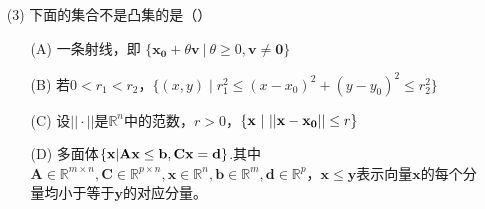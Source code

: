 \documentclass[12pt,a4paper,openany,twoside]{ctexbook}
\begin{document}
\begin{exercise}
\begin{itemize}


		\item [(3)] 下面的集合不是凸集的是（\quad）
		\begin{itemize}
			\item [(A)] 一条射线，即 $\{\mathbf{x_0}+\theta\mathbf{v}\ |\  \theta \geq0 ,\mathbf{v} \not= \mathbf{0}\}$
			\item [(B)] 若$0<r_1 < r_2$，$\{(x, y) \mid r_1^2 \leq (x - x_0)^2 + (y - y_0)^2 \leq r_2^2\}$
			\item [(C)] 设$||·||$是$\mathbb{R}^{n}$中的范数，$r>0$，$\{\mathbf{x}\ | \space\ ||\mathbf{x}-\mathbf{x_0}||\leq r \}$
			\item [(D)] 多面体$\{ \mathbf{x}| \space \mathbf{Ax}\leq\mathbf{b}, \mathbf{Cx}=\mathbf{d}\}$.其中$\mathbf{A}\in\mathbb{R}^{m \times n}, \mathbf{C} \in\mathbb{R}^{p \times n},\mathbf{x}\in\mathbb{R}^{n},\mathbf{b}\in\mathbb{R}^{m},\mathbf{d}\in\mathbb{R}^{p}$，$\mathbf{x}\leq\mathbf{y}$表示向量$\mathbf{x}$的每个分量均小于等于$\mathbf{y}$的对应分量。
		\end{itemize}


\end{itemize}
\end{exercise}
\end{document}
